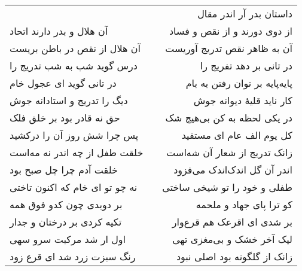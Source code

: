\begin{center}
\begin{longtable}{l p{0.5cm} r}
&&
داستان بدر آر اندر مقال
\\
آن هلال و بدر دارند اتحاد
&&
از دوی دورند و از نقص و فساد
\\
آن هلال از نقص در باطن بریست
&&
آن به ظاهر نقص تدریج آوریست
\\
درس گوید شب به شب تدریج را
&&
در تانی بر دهد تفریج را
\\
در تانی گوید ای عجول خام
&&
پایه‌پایه بر توان رفتن به بام
\\
دیگ را تدریج و استادانه جوش
&&
کار ناید قلیهٔ دیوانه جوش
\\
حق نه قادر بود بر خلق فلک
&&
در یکی لحظه به کن بی‌هیچ شک
\\
پس چرا شش روز آن را درکشید
&&
کل یوم الف عام ای مستفید
\\
خلقت طفل از چه اندر نه مه‌است
&&
زانک تدریج از شعار آن شه‌است
\\
خلقت آدم چرا چل صبح بود
&&
اندر آن گل اندک‌اندک می‌فزود
\\
نه چو تو ای خام که اکنون تاختی
&&
طفلی و خود را تو شیخی ساختی
\\
بر دویدی چون کدو فوق همه
&&
کو ترا پای جهاد و ملحمه
\\
تکیه کردی بر درختان و جدار
&&
بر شدی ای اقرعک هم قرع‌وار
\\
اول ار شد مرکبت سرو سهی
&&
لیک آخر خشک و بی‌مغزی تهی
\\
رنگ سبزت زرد شد ای قرع زود
&&
زانک از گلگونه بود اصلی نبود
\\
\end{longtable}
\end{center}

